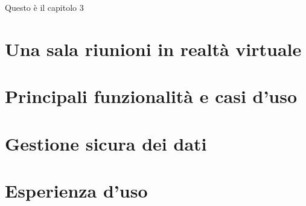 Questo è il capitolo 3
\section{Una sala riunioni in realtà virtuale}
\section{Principali funzionalità e casi d'uso}
\section{Gestione sicura dei dati}
\section{Esperienza d'uso}

